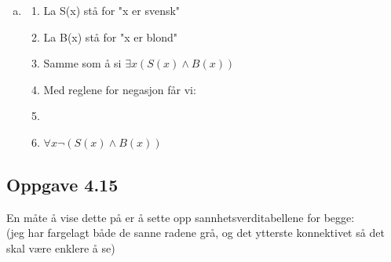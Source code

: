 \documentclass{article}
\begin{document}
\begin{enumerate}[(a)]
\begin{enumerate}[-]
    \end{enumerate}
    \item \textbf{}
    \begin{enumerate}[-]
        \item La S(x) stå for "x er svensk"
        \item La B(x) stå for "x er blond"
        \item Samme som å si $\exists x (S(x) \land B(x))$
        \item Med reglene for negasjon får vi:
        \item {}
        \item $\forall x \neg(S(x) \land B(x))$
    \end{enumerate}
\end{enumerate}

\newpage

\subsection*{Oppgave 4.15}

En måte å vise dette på er å sette opp sannhetsverditabellene for begge: \\
(jeg har fargelagt både de sanne radene grå, og det ytterste konnektivet så det skal være enklere å se)
\end{document}

